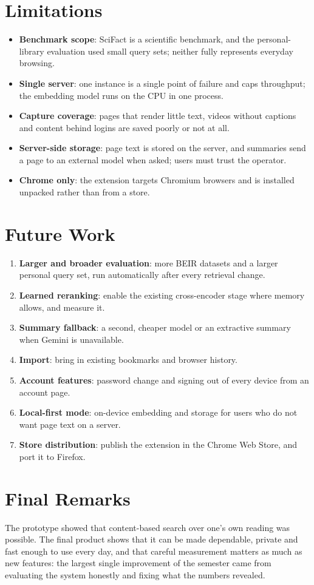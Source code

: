 \section{Limitations}

\begin{itemize}
  \item \textbf{Benchmark scope}: SciFact is a scientific benchmark, and the
  personal-library evaluation used small query sets; neither fully
  represents everyday browsing.
  \item \textbf{Single server}: one instance is a single point of failure
  and caps throughput; the embedding model runs on the CPU in one process.
  \item \textbf{Capture coverage}: pages that render little text, videos
  without captions and content behind logins are saved poorly or not at all.
  \item \textbf{Server-side storage}: page text is stored on the server, and
  summaries send a page to an external model when asked; users must trust
  the operator.
  \item \textbf{Chrome only}: the extension targets Chromium browsers and is
  installed unpacked rather than from a store.
\end{itemize}

\section{Future Work}

\begin{enumerate}
  \item \textbf{Larger and broader evaluation}: more BEIR datasets and a
  larger personal query set, run automatically after every retrieval change.
  \item \textbf{Learned reranking}: enable the existing cross-encoder stage
  where memory allows, and measure it.
  \item \textbf{Summary fallback}: a second, cheaper model or an extractive
  summary when Gemini is unavailable.
  \item \textbf{Import}: bring in existing bookmarks and browser history.
  \item \textbf{Account features}: password change and signing out of every
  device from an account page.
  \item \textbf{Local-first mode}: on-device embedding and storage for users
  who do not want page text on a server.
  \item \textbf{Store distribution}: publish the extension in the Chrome Web
  Store, and port it to Firefox.
\end{enumerate}

\section{Final Remarks}

The prototype showed that content-based search over one's own reading was
possible. The final product shows that it can be made dependable, private
and fast enough to use every day, and that careful measurement matters as
much as new features: the largest single improvement of the semester came
from evaluating the system honestly and fixing what the numbers revealed.
